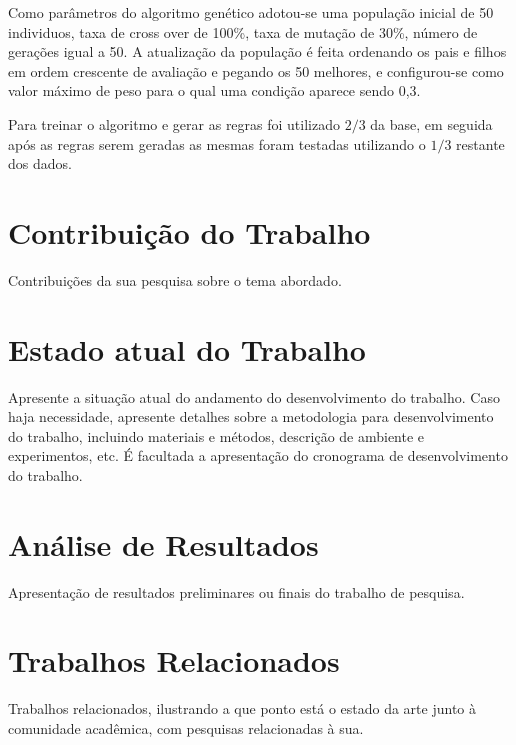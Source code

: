\documentclass[11pt]{article}
\begin{document}
Como parâmetros do algoritmo genético adotou-se uma população inicial de
50 individuos, taxa de cross over de 100\%, taxa de mutação de 30\%, número de
gerações igual a 50. A atualização da população é feita ordenando os pais e
filhos em ordem crescente de avaliação e pegando os 50 melhores, e configurou-se
como valor máximo de peso para o qual uma condição aparece sendo 0,3.

Para treinar o algoritmo e gerar as regras foi utilizado $2/3$ da base, em seguida
após as regras serem geradas as mesmas foram testadas utilizando o $1/3$ restante
dos dados.

\section{Contribuição do Trabalho}
\label{sec:contrib}

Contribuições da sua pesquisa sobre o tema abordado.

\section{Estado atual do Trabalho}
\label{sec:estado_atual}

Apresente a situação atual do andamento do desenvolvimento do trabalho. Caso haja necessidade, apresente detalhes sobre a metodologia para desenvolvimento do trabalho, incluindo materiais e métodos, descrição de ambiente e experimentos, etc. É facultada a apresentação do cronograma de desenvolvimento do trabalho.

\section{Análise de Resultados}
\label{sec:result}

Apresentação de resultados preliminares ou finais do trabalho de pesquisa.

\section{Trabalhos Relacionados}
\label{sec:trabalhos_relacionados}

Trabalhos relacionados, ilustrando a que ponto está o estado da arte junto à comunidade acadêmica, com pesquisas relacionadas à sua.



\end{document}

